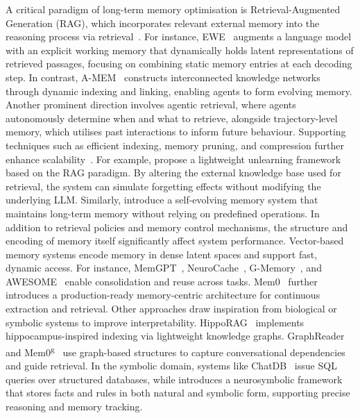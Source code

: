 \documentclass[]{selfevolagent}
\theoremstyle{plain}
\theoremstyle{definition}
\theoremstyle{remark}
\begin{document}
A critical paradigm of long-term memory optimisation is Retrieval-Augmented Generation (RAG), which incorporates relevant external memory into the reasoning process via retrieval~\citep{wang2023voyageropenendedembodiedagent,efeoglu2024retrieval,gao2025synergizingragreasoningsystematic}. For instance, EWE~\citep{chen2025improvingfactualityexplicitworking} augments a language model with an explicit working memory that dynamically holds latent representations of retrieved passages, focusing on combining static memory entries at each decoding step. In contrast, A-MEM~\citep{xu2025amemagenticmemoryllm} constructs interconnected knowledge networks through dynamic indexing and linking, enabling agents to form evolving memory. Another prominent direction involves agentic retrieval, where agents autonomously determine when and what to retrieve, alongside trajectory-level memory, which utilises past interactions to inform future behaviour. Supporting techniques such as efficient indexing, memory pruning, and compression further enhance scalability~\citep{zheng2024synapsetrajectoryasexemplarpromptingmemory,alizadeh2024llmflashefficientlarge}. For example, \cite{wang2024machineunlearningmeetsretrievalaugmented} propose a lightweight unlearning framework based on the RAG paradigm. By altering the external knowledge base used for retrieval, the system can simulate forgetting effects without modifying the underlying LLM. Similarly, \cite{xu2025amemagenticmemoryllm} introduce a self-evolving memory system that maintains long-term memory without relying on predefined operations. In addition to retrieval policies and memory control mechanisms, the structure and encoding of memory itself significantly affect system performance. Vector-based memory systems encode memory in dense latent spaces and support fast, dynamic access. For instance, MemGPT~\citep{packer2024memgptllmsoperatingsystems}, NeuroCache~\citep{safaya-yuret-2024-neurocache}, G-Memory~\citep{zhang2025g}, and AWESOME~\citep{cao2023awesomegpumemoryconstrainedlong} enable consolidation and reuse across tasks. Mem0~\citep{chhikara2025mem0buildingproductionreadyai} further introduces a production-ready memory-centric architecture for continuous extraction and retrieval. Other approaches draw inspiration from biological or symbolic systems to improve interpretability. HippoRAG~\citep{gutiérrez2025hipporagneurobiologicallyinspiredlongterm} implements hippocampus-inspired indexing via lightweight knowledge graphs. GraphReader~\citep{li2024graphreaderbuildinggraphbasedagent} and Mem0\textsuperscript{g}~\citep{chhikara2025mem0buildingproductionreadyai} use graph-based structures to capture conversational dependencies and guide retrieval. In the symbolic domain, systems like ChatDB~\citep{hu2023chatdbaugmentingllmsdatabases} issue SQL queries over structured databases, while \cite{wang2024symbolicworkingmemoryenhances} introduces a neurosymbolic framework that stores facts and rules in both natural and symbolic form, supporting precise reasoning and memory tracking.
\end{document}

